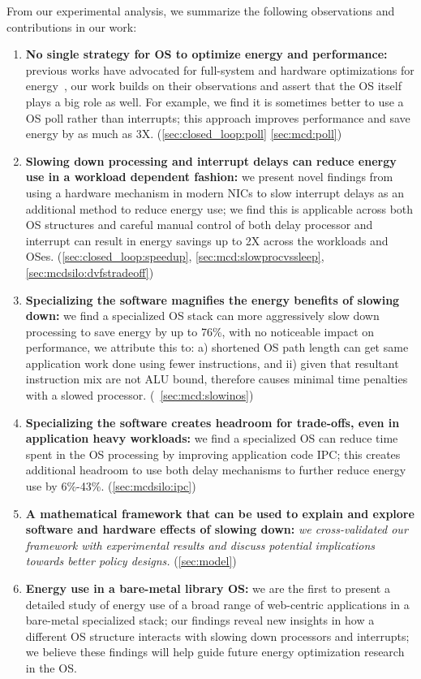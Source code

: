 From our experimental analysis, we summarize the following observations and contributions in our work:
\begin{enumerate}
    \item \textbf{No single strategy for OS to optimize energy and performance:} previous works have advocated for full-system and hardware optimizations for energy~\cite{slowdownorsleep,powernap}, our work builds on their observations and assert that the OS itself plays a big role as well. For example, we find it is sometimes better to use a OS poll rather than interrupts; this approach improves performance and save energy by as much as 3X. (\cref{sec:closed_loop:poll} \cref{sec:mcd:poll}) 
    \item \textbf{Slowing down processing and interrupt delays can reduce energy use in a workload dependent fashion:} we present novel findings from using a hardware mechanism in modern NICs to slow interrupt delays as an additional method to reduce energy use; we find this is applicable across both OS structures and careful manual control of both delay processor and interrupt can result in energy savings up to 2X across the workloads and OSes.  (\cref{sec:closed_loop:speedup}, \cref{sec:mcd:slowprocvssleep},
    \cref{sec:mcdsilo:dvfstradeoff})
    \item \textbf{Specializing the software magnifies the energy benefits of slowing down:} we find a specialized OS stack can more aggressively slow down processing to save energy by up to 76\%, with no noticeable impact on performance, we attribute this to: a) shortened OS path length can get same application work done using fewer instructions, and ii) given that resultant instruction mix are not ALU bound, therefore causes minimal time penalties with a slowed processor. (~\cref{sec:mcd:slowinos})
    \item \textbf{Specializing the software creates headroom for trade-offs, even in application heavy workloads:} we find a specialized OS can reduce time spent in the OS processing by improving application code IPC; this creates additional headroom to use both delay mechanisms to further reduce energy use by 6\%-43\%. (\cref{sec:mcdsilo:ipc}) 
    \item \textbf{A mathematical framework that can be used to explain and explore software and hardware effects of slowing down:} \textit{we cross-validated our framework with experimental results and discuss potential implications towards better policy designs.} (\cref{sec:model})
    \item \textbf{Energy use in a bare-metal library OS:} we are the first to present a detailed study of energy use of a broad range of web-centric applications in a bare-metal specialized stack; our findings reveal new insights in how a different OS structure interacts with slowing down processors and interrupts; we believe these findings will help guide future energy optimization research in the OS.
\end{enumerate}

